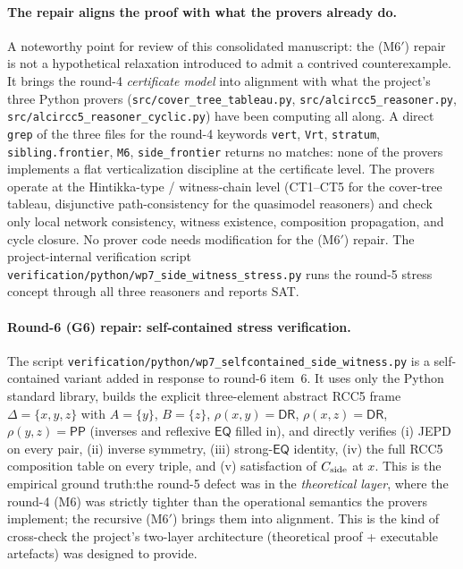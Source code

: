 \documentclass[11pt]{article}
\newcommand{\EQ}{\mathsf{EQ}}
\newcommand{\DR}{\mathsf{DR}}
\newcommand{\PP}{\mathsf{PP}}
\begin{document}
\paragraph{The repair aligns the proof with what the provers
already do.}  A noteworthy point for review of this consolidated
manuscript: the (M6$'$) repair is not a hypothetical relaxation
introduced to admit a contrived counterexample.  It brings the
round-4 \emph{certificate model} into alignment with what the
project's three Python provers (\texttt{src/cover\_tree\_tableau.py},
\texttt{src/alcircc5\_reasoner.py},
\texttt{src/alcircc5\_reasoner\_cyclic.py}) have been computing all
along.  A direct \texttt{grep} of the three files for the round-4
keywords \texttt{vert}, \texttt{Vrt}, \texttt{stratum},
\texttt{sibling.frontier}, \texttt{M6}, \texttt{side\_frontier}
returns no matches: none of the provers implements a flat
verticalization discipline at the certificate level.  The provers
operate at the Hintikka-type / witness-chain level (CT1--CT5 for
the cover-tree tableau, disjunctive path-consistency for the
quasimodel reasoners) and check only local network consistency,
witness existence, composition propagation, and cycle closure.  No
prover code needs modification for the (M6$'$) repair.  The
project-internal verification script
\texttt{verification/python/wp7\_side\_witness\_stress.py} runs the
round-5 stress concept through all three reasoners and reports SAT.

\paragraph{Round-6 (G6) repair: self-contained stress verification.}
The script
\texttt{verification/python/wp7\_selfcontained\_side\_witness.py}
is a self-contained variant added in response to round-6 item~6.
It uses only the Python standard library, builds the explicit
three-element abstract RCC5 frame
$\Delta=\{x,y,z\}$ with $A=\{y\}$, $B=\{z\}$, $\rho(x,y)=\DR$,
$\rho(x,z)=\DR$, $\rho(y,z)=\PP$ (inverses and reflexive $\EQ$
filled in), and directly verifies (i) JEPD on every pair, (ii)
inverse symmetry, (iii) strong-$\EQ$ identity, (iv) the full RCC5
composition table on every triple, and (v) satisfaction of
$C_{\rm side}$ at $x$.  This is the empirical ground truth:\@ the
round-5 defect was in the \emph{theoretical layer}, where the
round-4 (M6) was strictly tighter than the operational semantics
the provers implement; the recursive (M6$'$) brings them into
alignment.  This is the kind of cross-check the project's two-layer
architecture (theoretical proof + executable artefacts) was
designed to provide.
\end{document}
